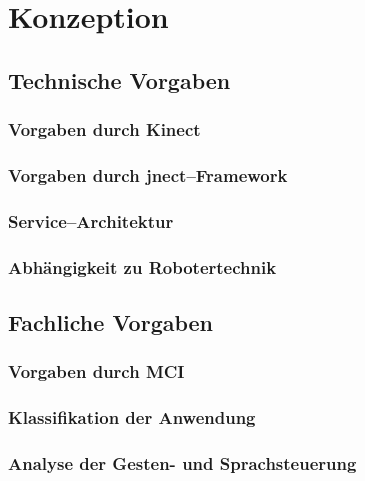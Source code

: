 \chapter{Konzeption}
\label{chap:Konzeption}

\section{Technische Vorgaben}

\subsection{Vorgaben durch Kinect}

\subsection{Vorgaben durch jnect--Framework}

\subsection{Service--Architektur}

\subsection{Abh\"angigkeit zu Robotertechnik}

\section{Fachliche Vorgaben}

\subsection{Vorgaben durch \gls{MCI}}

\subsection{Klassifikation der Anwendung}

\subsection{Analyse der Gesten- und Sprachsteuerung}
